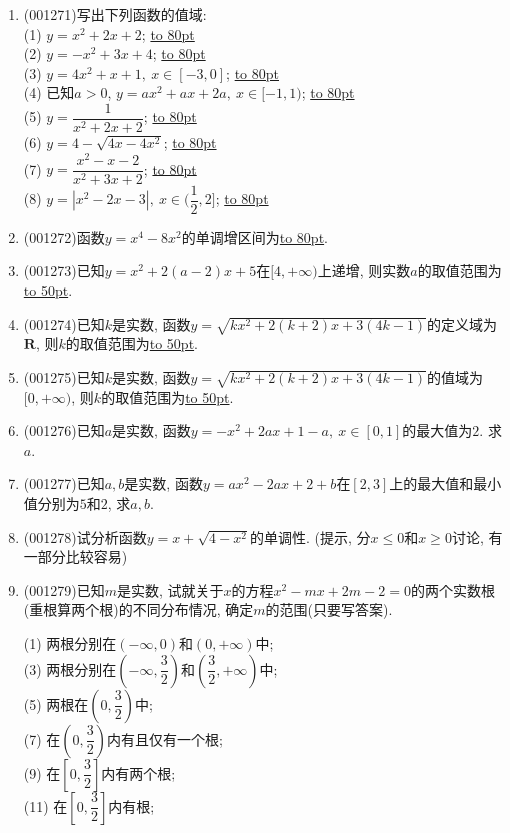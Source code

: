 \documentclass[10pt,a4paper]{article}
\newcommand{\blank}[1]{\underline{\hbox to #1pt{}}}
\begin{document}
\begin{enumerate}[1.]
(3) $y=-x^2+2x+3$; \blank{80}\\ 
(4) $y=\sqrt{-x^2+2x+3}$. \blank{80}
\item {\tiny (001271)}写出下列函数的值域:\\ 
(1) $y=x^2+2x+2$; \blank{80}\\ 
(2) $y=-x^2+3x+4$; \blank{80}\\ 
(3) $y=4x^2+x+1, \ x \in [-3,0]$; \blank{80}\\ 
(4) 已知$a>0$, $y=ax^2+ax+2a, \ x \in [-1,1)$; \blank{80}\\ 
(5) $y=\dfrac{1}{x^2+2x+2}$; \blank{80}\\ 
(6) $y=4-\sqrt{4x-4x^2}$; \blank{80}\\ 
(7) $y=\dfrac{x^2-x-2}{x^2+3x+2}$; \blank{80}\\ 
(8) $y=|x^2-2x-3|, \ x \in (\dfrac{1}{2},2]$; \blank{80}
\item {\tiny (001272)}函数$y=x^4-8x^2$的单调增区间为\blank{80}.
\item {\tiny (001273)}已知$y=x^2+2(a-2)x+5$在$[4,+\infty)$上递增, 则实数$a$的取值范围为\blank{50}.
\item {\tiny (001274)}已知$k$是实数, 函数$y=\sqrt{kx^2+2(k+2)x+3(4k-1)}$的定义域为$\mathbf{R}$, 则$k$的取值范围为\blank{50}.
\item {\tiny (001275)}已知$k$是实数, 函数$y=\sqrt{kx^2+2(k+2)x+3(4k-1)}$的值域为$[0,+\infty)$, 则$k$的取值范围为\blank{50}.
\item {\tiny (001276)}已知$a$是实数, 函数$y=-x^2+2ax+1-a, \ x \in [0,1]$的最大值为$2$. 求$a$.
\item {\tiny (001277)}已知$a,b$是实数, 函数$y=ax^2-2ax+2+b$在$[2,3]$上的最大值和最小值分别为$5$和$2$, 求$a,b$.
\item {\tiny (001278)}试分析函数$y=x+\sqrt{4-x^2}$的单调性. (提示, 分$x\le0$和$x \ge 0$讨论, 有一部分比较容易)
\item {\tiny (001279)}已知$m$是实数, 试就关于$x$的方程$x^2-mx+2m-2=0$的两个实数根(重根算两个根)的不同分布情况, 确定$m$的范围(只要写答案).
\begin{multicols}{2}
(1) 两根分别在$(-\infty,0)$和$(0,+\infty)$中;\\ 
(3) 两根分别在$(-\infty,\dfrac{3}{2})$和$(\dfrac{3}{2},+\infty)$中;\\ 
(5) 两根在$(0,\dfrac{3}{2})$中;\\ 
(7) 在$(0,\dfrac{3}{2})$内有且仅有一个根;\\ 
(9) 在$[0,\dfrac{3}{2}]$内有两个根;\\ 
(11) 在$[0,\dfrac{3}{2}]$内有根;\\ 

\end{multicols}
\end{enumerate}
\end{document}
